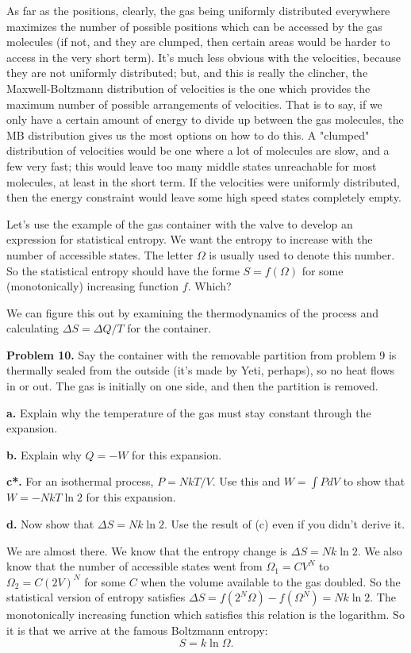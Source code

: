 \documentclass[12pt]{article}
\begin{document}
As far as the positions, clearly, the gas being uniformly distributed everywhere maximizes the number of possible positions which can be accessed by the gas molecules (if not, and they are clumped, then certain areas would be harder to access in the very short term). It's much less obvious with the velocities, because they are not uniformly distributed; but, and this is really the clincher, the Maxwell-Boltzmann distribution of velocities is the one which provides the maximum number of possible arrangements of velocities. That is to say, if we only have a certain amount of energy to divide up between the gas molecules, the MB distribution gives us the most options on how to do this. A "clumped" distribution of velocities would be one where a lot of molecules are slow, and a few very fast; this would leave too many middle states unreachable for most molecules, at least in the short term. If the velocities were uniformly distributed, then the energy constraint would leave some high speed states completely empty.

Let's use the example of the gas container with the valve to develop an expression for statistical entropy. We want the entropy to increase with the number of accessible states. The letter $\Omega$ is usually used to denote this number. So the statistical entropy should have the forme $S=f(\Omega)$ for some (monotonically) increasing function $f$. Which?

We can figure this out by examining the thermodynamics of the process and calculating $\Delta S=\Delta Q/T$ for the container.

\textbf{Problem 10.} Say the container with the removable partition from problem 9 is thermally sealed from the outside (it's made by Yeti, perhaps), so no heat flows in or out. The gas is initially on one side, and then the partition is removed.

\textbf{a.} Explain why the temperature of the gas must stay constant through the expansion.

\textbf{b.} Explain why $Q=-W$ for this expansion. 

\textbf{c*.} For an isothermal process, $P=NkT/V$. Use this and $W=\int P dV$ to show that $W=-NkT\ln 2$ for this expansion.

\textbf{d.} Now show that $\Delta S=Nk \ln 2$. Use the result of (c) even if you didn't derive it.

We are almost there. We know that the entropy change is $\Delta S = Nk \ln 2$. We also know that the number of accessible states went from $\Omega_1=CV^N$ to $\Omega_2=C(2V)^N$ for some $C$ when the volume available to the gas doubled. So the statistical version of entropy satisfies $\Delta S = f(2^N\Omega)-f(\Omega^N)= Nk \ln 2$. The monotonically increasing function which satisfies this relation is the logarithm. So it is that we arrive at the famous Boltzmann entropy:
\begin{equation}
S = k \ln \Omega.
\end{equation}
\end{document}
